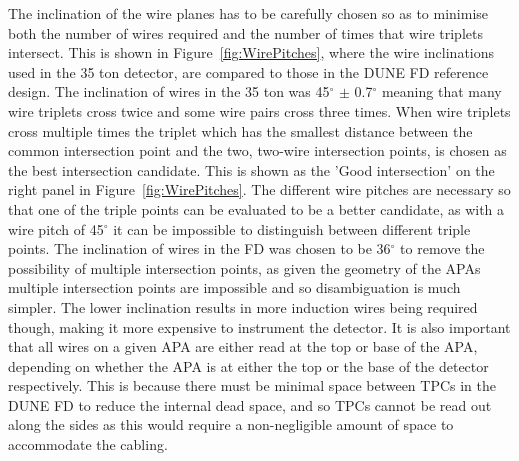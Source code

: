 The inclination of the wire planes has to be carefully chosen so as to minimise both the number of wires required and the number of times that wire triplets intersect. This is shown in Figure~\ref{fig:WirePitches}, where the wire inclinations used in the 35 ton detector, are compared to those in the DUNE FD reference design. The inclination of wires in the 35 ton was 45$^{\circ}$ $\pm$ 0.7$^{\circ}$ meaning that many wire triplets cross twice and some wire pairs cross three times. When wire triplets cross multiple times the triplet which has the smallest distance between the common intersection point and the two, two-wire intersection points, is chosen as the best intersection candidate. This is shown as the 'Good intersection' on the right panel in Figure~\ref{fig:WirePitches}. The different wire pitches are necessary so that one of the triple points can be evaluated to be a better candidate, as with a wire pitch of 45$^{\circ}$ it can be impossible to distinguish between different triple points. The inclination of wires in the FD was chosen to be 36$^{\circ}$ to remove the possibility of multiple intersection points, as given the geometry of the APAs multiple intersection points are impossible and so disambiguation is much simpler. The lower inclination results in more induction wires being required though, making it more expensive to instrument the detector. It is also important that all wires on a given APA are either read at the top or base of the APA, depending on whether the APA is at either the top or the base of the detector respectively. This is because there must be minimal space between TPCs in the DUNE FD to reduce the internal dead space, and so TPCs cannot be read out along the sides as this would require a non-negligible amount of space to accommodate the cabling.\\

